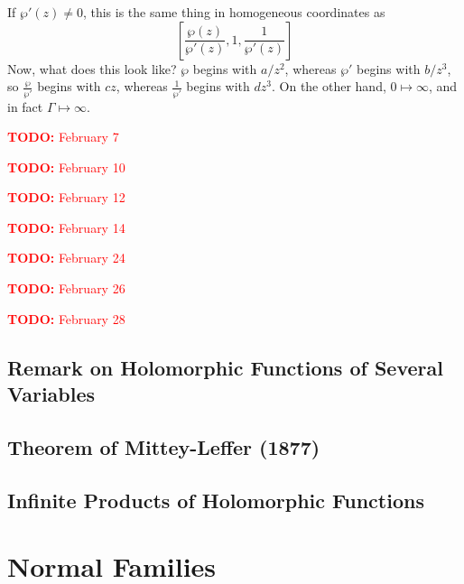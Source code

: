 \documentclass{article}
\newcommand{\TODO}[1]{\begin{center}\huge{\textcolor{red}{\textbf{TODO:} #1}}\end{center}}
\begin{document}
If \(\wp'(z) \neq 0\), this is the same thing in homogeneous coordinates as
\[\left[\frac{\wp(z)}{\wp'(z)}, 1, \frac{1}{\wp'(z)}\right]\]
Now, what does this look like? \(\wp\) begins with \(a/z^2\), whereas \(\wp'\) begins with \(b/z^3\), so \(\frac{\wp}{\wp'}\) begins with \(cz\), whereas \(\frac{1}{\wp'}\) begins with \(dz^3\). On the other hand, \(0 \mapsto \infty\), and in fact \(\Gamma \mapsto \infty\).

\TODO{February 7}

\TODO{February 10}

\TODO{February 12}

\TODO{February 14}

\TODO{February 24}

\TODO{February 26}

\TODO{February 28}

\subsection{Remark on Holomorphic Functions of Several Variables}

\subsection{Theorem of Mittey-Leffer (1877)}

\subsection{Infinite Products of Holomorphic Functions}

\section{Normal Families}
\end{document}
